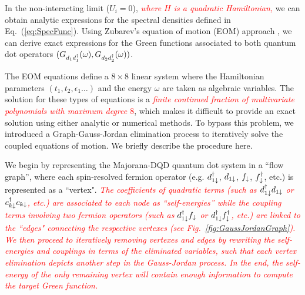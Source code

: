 \documentclass[showpacs,aps,prb,reprint,superscriptaddress]{revtex4-2}
\newcommand{\change}[1]{\textcolor{red}{\sl#1}}
\begin{document}
In the non-interacting limit ($U_i\!=\!0$), \change{where $H$ is a quadratic Hamiltonian,} we can obtain analytic expressions for the spectral densities defined in Eq.\ (\ref{eq:SpecFunc}). Using Zubarev's equation of motion (EOM) approach \cite{zubarev_double-time_1960}, we can derive  exact expressions for the Green functions associated to both quantum dot operators $(G_{d_1d^\dagger_1}(\omega),G_{d_2d^\dagger_2}(\omega))$. 

 The EOM  equations define a $8 \times 8$ linear system where the Hamiltonian parameters $(t_1,t_2,\epsilon_1 \ldots)$ and the energy $\omega$ are taken as algebraic variables. The solution for these types of equations is a \change{finite continued fraction of multivariate polynomials with maximum degree $8$}, which makes it difficult to provide an exact solution using either analytic or numerical methods. To bypass this problem, we introduced a Graph-Gauss-Jordan elimination process \cite{spielman_algorithms_2010} to iteratively solve the coupled equations of motion. We briefly describe the procedure here. 

We begin by representing the Majorana-DQD quantum dot system in a ``flow graph'', where each spin-resolved fermion operator (e.g. $d^{\dagger}_{1 \downarrow}$, $d_{1 \downarrow}$, $f_{\downarrow}$, $f^{\dagger}_{\downarrow}$, etc.) is represented as a ``vertex". \change{ The coefficients of quadratic terms (such as $d^{\dagger}_{1 \downarrow} d_{1 \downarrow}$ or $c^{\dagger}_{k \downarrow} c_{k\downarrow}$, etc.) are associated to each node as ``self-energies'' while the coupling terms involving two fermion operators  (such as $d^{\dagger}_{1 \downarrow} f_{\downarrow}$ or $d^{\dagger}_{1 \downarrow} f^{\dagger}_{\downarrow}$, etc.) are linked to the ``edges" connecting the respective vertexes (see Fig.\ \ref{fig:GaussJordanGraph}). We then proceed to iteratively removing vertexes and edges by rewriting the self-energies and couplings in terms of the eliminated variables, such that each vertex elimination depicts another step in the  Gauss-Jordan process. In the end, the self-energy of the only remaining vertex will contain enough information to compute the target Green function.} 

\end{document}
